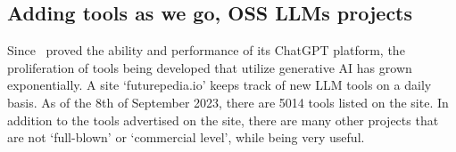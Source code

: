 \subsection{Adding tools as we go, OSS LLMs projects}
Since \openai\ proved the ability and performance of its ChatGPT platform, the proliferation of tools being developed that utilize generative AI has grown exponentially.
A site `futurepedia.io' keeps track of new LLM tools on a daily basis.
As of the 8th of September 2023, there are 5014 tools listed on the site.
In addition to the tools advertised on the site, there are many other projects that are not `full-blown' or `commercial level', while being very useful.